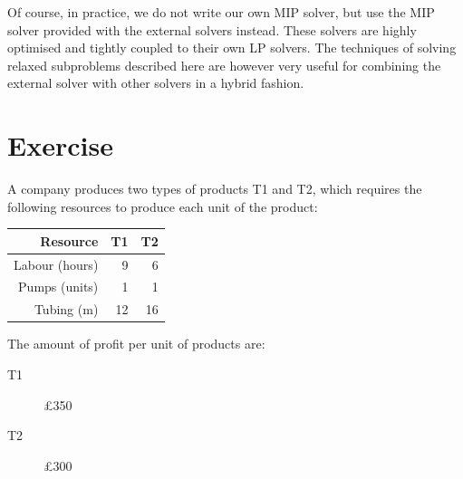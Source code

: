 
Of course, in practice, we do not write our own MIP solver, but 
use the MIP solver provided with the external solvers instead. These
solvers are highly optimised and tightly coupled to their own LP solvers. 
The techniques of solving relaxed subproblems described here are however
very useful for combining the external solver with other solvers in a
hybrid fashion. 

\section{Exercise}

A company produces two types of products T1 and T2, which requires the
following resources to produce each unit of the product:

\vspace{3mm}
\begin{center}
\begin{tabular}{|r||r|r|}\hline
Resource & T1 & T2\\ \hline
Labour (hours) & 9 & 6\\ \hline
Pumps (units) & 1 & 1\\ \hline
Tubing (m) & 12 & 16\\ \hline
\end{tabular}
\end{center}
\vspace{3mm}

The amount of profit per unit of products are:

\begin{description}
\item[T1] \pounds350
\item[T2] \pounds300
\end{description}

